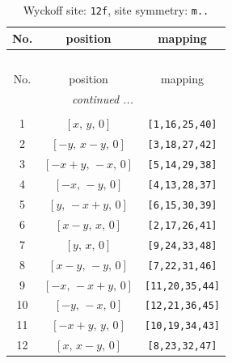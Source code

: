 \documentclass[fleqn,8pt]{jsarticle}
\begin{document}
\begin{longtable}{ccc}
\caption{Wyckoff site: {\tt 12f}, site symmetry: {\tt m..}}
 \\
 \hline \hline
No. & position & mapping \\ \hline \endfirsthead

\multicolumn{2}{l}{\tablename\ \thetable{}} \\
 \hline \hline
No. & position & mapping \\ \hline \endhead

 \hline \hline
\multicolumn{2}{r}{\footnotesize\it continued ...} \\ \endfoot

 \hline \hline
\multicolumn{2}{r}{} \\ \endlastfoot

1 & $\left[ x,\, y,\, 0 \right]$ & {\tt [1,16,25,40]} \\ \hline
2 & $\left[ - y,\, x - y,\, 0 \right]$ & {\tt [3,18,27,42]} \\ \hline
3 & $\left[ - x + y,\, - x,\, 0 \right]$ & {\tt [5,14,29,38]} \\ \hline
4 & $\left[ - x,\, - y,\, 0 \right]$ & {\tt [4,13,28,37]} \\ \hline
5 & $\left[ y,\, - x + y,\, 0 \right]$ & {\tt [6,15,30,39]} \\ \hline
6 & $\left[ x - y,\, x,\, 0 \right]$ & {\tt [2,17,26,41]} \\ \hline
7 & $\left[ y,\, x,\, 0 \right]$ & {\tt [9,24,33,48]} \\ \hline
8 & $\left[ x - y,\, - y,\, 0 \right]$ & {\tt [7,22,31,46]} \\ \hline
9 & $\left[ - x,\, - x + y,\, 0 \right]$ & {\tt [11,20,35,44]} \\ \hline
10 & $\left[ - y,\, - x,\, 0 \right]$ & {\tt [12,21,36,45]} \\ \hline
11 & $\left[ - x + y,\, y,\, 0 \right]$ & {\tt [10,19,34,43]} \\ \hline
12 & $\left[ x,\, x - y,\, 0 \right]$ & {\tt [8,23,32,47]} \\
\end{longtable}
\renewcommand{\arraystretch}{1.2}
\end{document}
